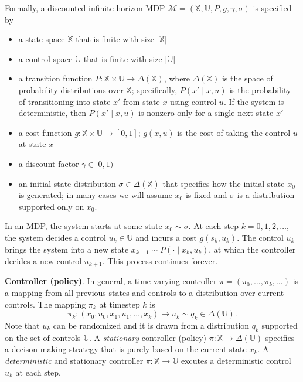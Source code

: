 \documentclass[
]{book}
\theoremstyle{definition}
\theoremstyle{definition}
\theoremstyle{definition}
\theoremstyle{definition}
\theoremstyle{remark}
\begin{document}
Formally, a discounted infinite-horizon MDP \(\mathcal{M} = (\mathbb{X},\mathbb{U},P,g,\gamma,\sigma)\) is specified by

\begin{itemize}
\item
  a state space \(\mathbb{X}\) that is finite with size \(|\mathbb{X}|\)
\item
  a control space \(\mathbb{U}\) that is finite with size \(|\mathbb{U}|\)
\item
  a transition function \(P: \mathbb{X} \times \mathbb{U} \rightarrow \Delta(\mathbb{X})\), where \(\Delta(\mathbb{X})\) is the space of probability distributions over \(\mathbb{X}\); specifically, \(P(x' \mid x, u)\) is the probability of transitioning into state \(x'\) from state \(x\) using control \(u\). If the system is deterministic, then \(P(x' \mid x, u)\) is nonzero only for a single next state \(x'\)
\item
  a cost function \(g: \mathbb{X} \times \mathbb{U} \rightarrow [0,1]\); \(g(x,u)\) is the cost of taking the control \(u\) at state \(x\)
\item
  a discount factor \(\gamma \in [0,1)\)
\item
  an initial state distribution \(\sigma \in \Delta(\mathbb{X})\) that specifies how the initial state \(x_0\) is generated; in many cases we will assume \(x_0\) is fixed and \(\sigma\) is a distribution supported only on \(x_0\).
\end{itemize}

In an MDP, the system starts at some state \(x_0 \sim \sigma\). At each step \(k = 0,1,2,\dots\), the system decides a control \(u_k \in \mathbb{U}\) and incurs a cost \(g(s_k,u_k)\). The control \(u_k\) brings the system into a new state \(x_{k+1} \sim P(\cdot \mid x_k, u_k)\), at which the controller decides a new control \(u_{k+1}\). This process continues forever.

\textbf{Controller (policy)}. In general, a time-varying controller \(\pi = (\pi_0,\dots,\pi_k,\dots)\) is a mapping from all previous states and controls to a distribution over current controls. The mapping \(\pi_k\) at timestep \(k\) is
\[
\pi_k: (x_0,u_0,x_1,u_1,\dots,x_k) \mapsto u_k \sim q_k \in \Delta(\mathbb{U}).
\]
Note that \(u_k\) can be randomized and it is drawn from a distribution \(q_k\) supported on the set of controls \(\mathbb{U}\).
A \emph{stationary} controller (policy) \(\pi: \mathbb{X} \rightarrow \Delta(\mathbb{U})\) specifies a decison-making strategy that is purely based on the current state \(x_k\). A \emph{deterministic} and stationary controller \(\pi: \mathbb{X} \rightarrow \mathbb{U}\) excutes a deterministic control \(u_k\) at each step.
\end{document}
